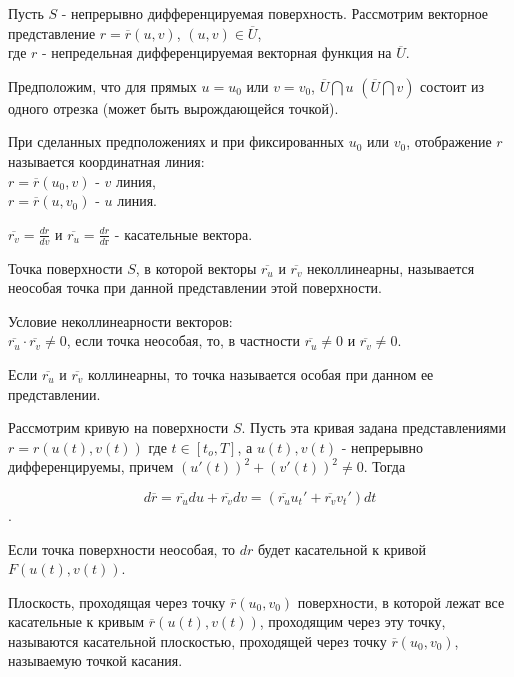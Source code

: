 Пусть $S$ - непрерывно дифференцируемая поверхность. Рассмотрим векторное представление $r = \overline{r}(u,v)$, $(u,v) \in \overline{U}$,
\\
где $r$ - непредельная дифференцируемая векторная функция на $\overline{U}$.

Предположим, что для прямых $u=u_0$ или $v=v_0$, $\overline{U} \bigcap u$ $(\overline{U} \bigcap v)$ состоит из одного отрезка (может быть вырождающейся точкой).

\opred

При сделанных предположениях и при фиксированных $u_0$ или $v_0$, отображение $r$ называется координатная линия:
\\
$r = \overline{r}(u_0,v)$ - $v$ линия,
\\
$r = \overline{r}(u,v_0)$ - $u$ линия.

\opred

$\overline{r_v} = \frac{dr}{dv}$ и $\overline{r_u} = \frac{dr}{dг}$ - касательные вектора.

\opred

Точка поверхности $S$, в которой векторы $\overline{r_u}$ и $\overline{r_v}$ неколлинеарны, называется неособая точка при данной представлении этой поверхности. 

Условие неколлинеарности векторов:
\\
$\overline{r_u} \cdot \overline{r_v} \neq 0$, если точка неособая, то, в частности $\overline{r_u} \neq 0$ и $\overline{r_v} \neq 0$.

\opred

Если $\overline{r_u}$ и $\overline{r_v}$ коллинеарны, то точка называется особая при данном ее представлении.

Рассмотрим кривую на поверхности $S$. Пусть эта кривая задана представлениями $r=r(u(t),v(t))$ где $t \in [t_o, T]$, а $u(t),v(t)$ - непрерывно дифференцируемы, причем $(u'(t))^2+(v'(t))^2 \neq 0$. Тогда 

$$d\overline{r} = \overline{r_u}du+ \overline{r_v}dv = (\overline{r_u}u_t' + \overline{r_v}v_t')dt$$.

\opred

Если точка поверхности неособая, то $dr$ будет касательной к кривой $F(u(t),v(t))$.

\opred

Плоскость, проходящая через точку $\overline{r}(u_0,v_0)$ поверхности, в которой лежат все касательные к кривым $\overline{r}(u(t),v(t))$, проходящим через эту точку, 
\\
называются касательной плоскостью, проходящей через точку $\overline{r}(u_0,v_0)$,
\\
называемую точкой касания.

